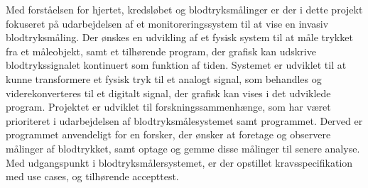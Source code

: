 Med forståelsen for hjertet, kredsløbet og blodtryksmålinger er der i dette projekt fokuseret på udarbejdelsen af et monitoreringssystem til at vise en invasiv blodtryksmåling. Der ønskes en udvikling af et fysisk system til at måle trykket fra et måleobjekt, samt et tilhørende program, der grafisk kan udskrive blodtrykssignalet kontinuert som funktion af tiden. Systemet er udviklet til at kunne transformere et fysisk tryk til et analogt signal, som behandles og viderekonverteres til et digitalt signal, der grafisk kan vises i det udviklede program. Projektet er udviklet til forskningssammenhænge, som har været prioriteret i udarbejdelsen af blodtryksmålesystemet samt programmet. Derved er programmet anvendeligt for en forsker, der ønsker at foretage og observere målinger af blodtrykket, samt optage og gemme disse målinger til senere analyse. 
Med udgangspunkt i blodtryksmålersystemet, er der opstillet kravsspecifikation med use cases, og tilhørende accepttest. 
